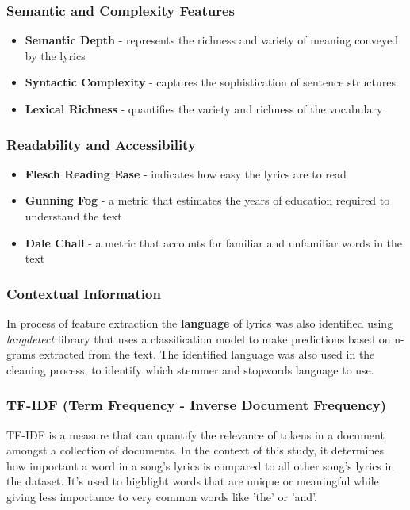 \subsubsection*{Semantic and Complexity Features}
\begin{itemize}
  \item \textbf{Semantic Depth} - represents the richness and variety of
    meaning conveyed by the lyrics
  \item \textbf{Syntactic Complexity} - captures the sophistication of
    sentence structures
  \item \textbf{Lexical Richness} - quantifies the variety and richness of the
    vocabulary
\end{itemize}



\subsubsection*{Readability and Accessibility}
\begin{itemize}
  \item \textbf{Flesch Reading Ease} - indicates how easy the lyrics are to
    read
  \item \textbf{Gunning Fog} - a metric that estimates the  years of education
    required to understand the text
  \item \textbf{Dale Chall} - a metric that accounts for familiar and
    unfamiliar words in the text
\end{itemize}


\subsubsection*{Contextual Information}
  In process of feature extraction the \textbf{language} of lyrics was also
  identified using \textit{langdetect} library that uses a classification model
  to make predictions based on n-grams extracted from the text. The identified
  language was also used in the cleaning process, to identify which stemmer and
  stopwords language  to use.


\subsubsection*{TF-IDF (Term Frequency - Inverse Document Frequency)}

TF-IDF\cite{tfidf} is a measure that can quantify the relevance of tokens in a document
amongst a collection of documents. In the context of this study, it determines
how important a word in a song's lyrics is  compared to all other song's lyrics
in the dataset. It's used to highlight words that are unique or meaningful
while giving less importance to very common words like 'the' or 'and'.

